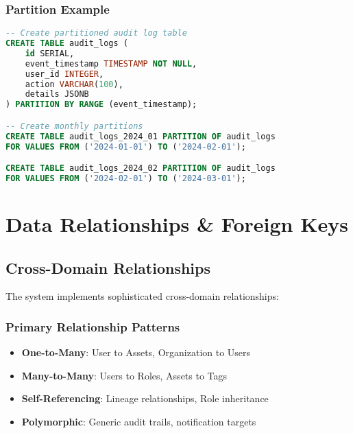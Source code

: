 \subsubsection{Partition Example}
\begin{lstlisting}[language=SQL, caption=Time-based Partitioning Example]
-- Create partitioned audit log table
CREATE TABLE audit_logs (
    id SERIAL,
    event_timestamp TIMESTAMP NOT NULL,
    user_id INTEGER,
    action VARCHAR(100),
    details JSONB
) PARTITION BY RANGE (event_timestamp);

-- Create monthly partitions
CREATE TABLE audit_logs_2024_01 PARTITION OF audit_logs
FOR VALUES FROM ('2024-01-01') TO ('2024-02-01');

CREATE TABLE audit_logs_2024_02 PARTITION OF audit_logs
FOR VALUES FROM ('2024-02-01') TO ('2024-03-01');
\end{lstlisting}

\section{Data Relationships \& Foreign Keys}

\subsection{Cross-Domain Relationships}

The system implements sophisticated cross-domain relationships:

\subsubsection{Primary Relationship Patterns}
\begin{itemize}
    \item \textbf{One-to-Many}: User to Assets, Organization to Users
    \item \textbf{Many-to-Many}: Users to Roles, Assets to Tags
    \item \textbf{Self-Referencing}: Lineage relationships, Role inheritance
    \item \textbf{Polymorphic}: Generic audit trails, notification targets
\end{itemize}

